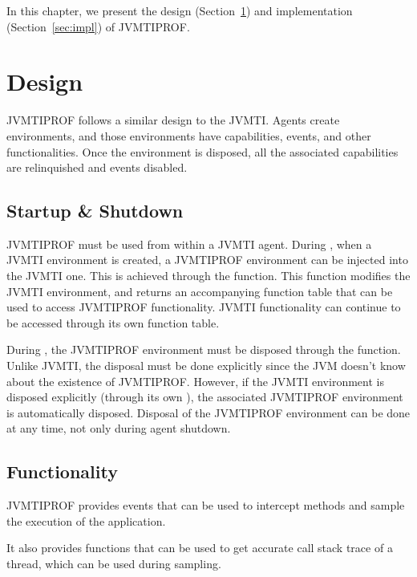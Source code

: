 

In this chapter, we present the design (Section~\ref{sec:design}) and implementation (Section~\ref{sec:impl}) of JVMTIPROF.

\section{Design} \label{sec:design}

JVMTIPROF follows a similar design to the JVMTI. Agents create environments, and those environments have capabilities, events, and other functionalities. Once the environment is disposed, all the associated capabilities are relinquished and events disabled.

\subsection{Startup \& Shutdown}

JVMTIPROF must be used from within a JVMTI agent. During , when a JVMTI environment is created, a JVMTIPROF environment can be injected into the JVMTI one. This is achieved through the  function. This function modifies the JVMTI environment, and returns an accompanying function table that can be used to access JVMTIPROF functionality. JVMTI functionality can continue to be accessed through its own function table.

During , the JVMTIPROF environment must be disposed through the  function. Unlike JVMTI, the disposal must be done explicitly since the JVM doesn't know about the existence of JVMTIPROF. However, if the JVMTI environment is disposed explicitly (through its own ), the associated JVMTIPROF environment is automatically disposed. Disposal of the JVMTIPROF environment can be done at any time, not only during agent shutdown.

\subsection{Functionality}

JVMTIPROF provides events that can be used to intercept methods and sample the execution of the application.

It also provides functions that can be used to get accurate call stack trace of a thread, which can be used during sampling.

